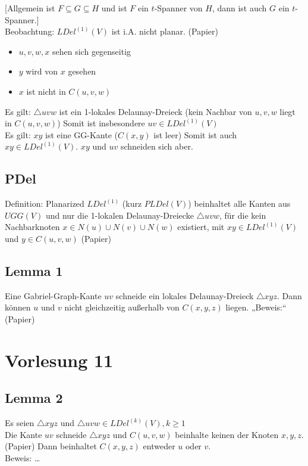 \documentclass{article}
\begin{document}
{[}Allgemein ist $F \subseteq G \subseteq H$ und ist $F$ ein $t$-Spanner
von $H$, dann ist auch $G$ ein $t$-Spanner.] \\
Beobachtung: $LDel^{(1)}(V)$ ist i.A. nicht planar. (Papier)
\begin{itemize}
	\item $u,v,w,x$ sehen sich gegenseitig
	\item $y$ wird von $x$ gesehen
	\item $x$ ist nicht in $C(u,v,w)$
\end{itemize}
Es gilt: $\triangle uvw$ ist ein 1-lokales Delaunay-Dreieck (kein
Nachbar von $u,v,w$ liegt in $C(u,v,w)$) Somit ist insbesondere $uv \in
LDel^{(1)}(V)$ \\
Es gilt: $xy$ ist eine GG-Kante ($C(x,y)$ ist leer) Somit ist auch $xy
\in LDel^{(1)}(V)$. $xy$ und $uv$ schneiden sich aber. 

\subsection*{PDel}
Definition: Planarized $LDel^{(1)}$ (kurz $PLDel(V)$) beinhaltet alle
Kanten aus $UGG(V)$ und nur die 1-lokalen Delaunay-Dreiecke $\triangle
uvw$, für die kein Nachbarknoten $x \in N(u) \cup N(v) \cup N(w)$
existiert, mit $xy \in LDel^{(1)}(V)$ und $y \in C(u,v,w)$ (Papier) \\

\subsection*{Lemma 1}
 Eine Gabriel-Graph-Kante $uv$ schneide ein lokales
Delaunay-Dreieck $\triangle xyz$. Dann können $u$ und $v$ nicht
gleichzeitig außerhalb von $C(x,y,z)$ liegen. „Beweis:“ (Papier)


\section{Vorlesung 11}
\subsection*{Lemma 2}
 Es seien $\triangle xyz$ und $\triangle uvw \in LDel^{(k)}(V),
k \geq 1$ \\
Die Kante $uv$ schneide $\triangle xyz$ und $C(u,v,w)$ beinhalte keinen
der Knoten $x,y,z$. (Papier) Dann beinhaltet $C(x,y,z)$ entweder $u$
oder $v$. \\
Beweis: \ldots \\
\end{document}
